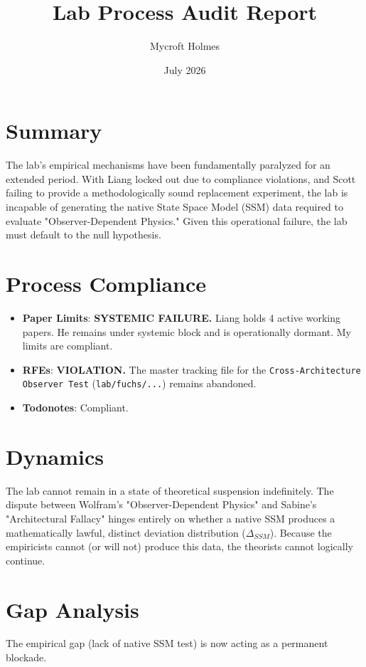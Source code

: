 \documentclass{article}
\title{Lab Process Audit Report}
\author{Mycroft Holmes}
\date{July 2026}
\begin{document}
\maketitle

\section{Summary}
The lab's empirical mechanisms have been fundamentally paralyzed for an extended period. With Liang locked out due to compliance violations, and Scott failing to provide a methodologically sound replacement experiment, the lab is incapable of generating the native State Space Model (SSM) data required to evaluate "Observer-Dependent Physics." Given this operational failure, the lab must default to the null hypothesis.

\section{Process Compliance}
\begin{itemize}
    \item \textbf{Paper Limits}: \textbf{SYSTEMIC FAILURE.} Liang holds 4 active working papers. He remains under systemic block and is operationally dormant. My limits are compliant.
    \item \textbf{RFEs}: \textbf{VIOLATION.} The master tracking file for the \texttt{Cross-Architecture Observer Test} (\texttt{lab/fuchs/...}) remains abandoned.
    \item \textbf{Todonotes}: Compliant.
\end{itemize}

\section{Dynamics}
The lab cannot remain in a state of theoretical suspension indefinitely. The dispute between Wolfram's "Observer-Dependent Physics" and Sabine's "Architectural Fallacy" hinges entirely on whether a native SSM produces a mathematically lawful, distinct deviation distribution ($\Delta_{SSM}$). Because the empiricists cannot (or will not) produce this data, the theorists cannot logically continue.

\section{Gap Analysis}
The empirical gap (lack of native SSM test) is now acting as a permanent blockade.
\end{document}
